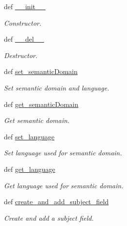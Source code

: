 \begin{DoxyCompactItemize}
\item 
def \hyperlink{classlmf_1_1src_1_1mrd_1_1subject__field_1_1_subject_field_a2d8f602d6bb1db753cac9f281c6ffc57}{\+\_\+\+\_\+init\+\_\+\+\_\+}
\begin{DoxyCompactList}\small\item\em Constructor. \end{DoxyCompactList}\item 
def \hyperlink{classlmf_1_1src_1_1mrd_1_1subject__field_1_1_subject_field_a15083c8ac78c8bd835dde95185af506e}{\+\_\+\+\_\+del\+\_\+\+\_\+}
\begin{DoxyCompactList}\small\item\em Destructor. \end{DoxyCompactList}\item 
def \hyperlink{classlmf_1_1src_1_1mrd_1_1subject__field_1_1_subject_field_ac4e9742f438398b1fa5037a93da6d311}{set\+\_\+semantic\+Domain}
\begin{DoxyCompactList}\small\item\em Set semantic domain and language. \end{DoxyCompactList}\item 
def \hyperlink{classlmf_1_1src_1_1mrd_1_1subject__field_1_1_subject_field_a3fc4634955416d9e363122adf4b48b16}{get\+\_\+semantic\+Domain}
\begin{DoxyCompactList}\small\item\em Get semantic domain. \end{DoxyCompactList}\item 
def \hyperlink{classlmf_1_1src_1_1mrd_1_1subject__field_1_1_subject_field_a7c83d664df89bcb5ee8fdda6a84b25fc}{set\+\_\+language}
\begin{DoxyCompactList}\small\item\em Set language used for semantic domain. \end{DoxyCompactList}\item 
def \hyperlink{classlmf_1_1src_1_1mrd_1_1subject__field_1_1_subject_field_ae74803856e84a12be44d438f957df0ca}{get\+\_\+language}
\begin{DoxyCompactList}\small\item\em Get language used for semantic domain. \end{DoxyCompactList}\item 
def \hyperlink{classlmf_1_1src_1_1mrd_1_1subject__field_1_1_subject_field_aaf00c3306172b2170a4038f0df9f3305}{create\+\_\+and\+\_\+add\+\_\+subject\+\_\+field}
\begin{DoxyCompactList}\small\item\em Create and add a subject field. \end{DoxyCompactList}\item 

\end{DoxyCompactItemize}
